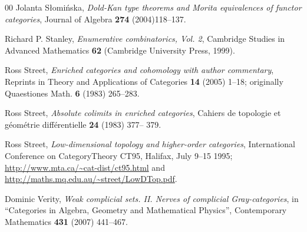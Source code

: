\documentclass[a4paper,12pt,reqno]{amsart}
\theoremstyle{definition}
\theoremstyle{fact}
\theoremstyle{genquest}
\theoremstyle{step}
\begin{document}
\begin{thebibliography}{00}
 Jolanta S\l omi\'nska, \textit{Dold-Kan type theorems and Morita equivalences of functor categories}, Journal of Algebra \textbf{274} (2004)118--137.\label{Slom}

 Richard P. Stanley, \textit{Enumerative combinatorics, Vol. 2}, Cambridge Studies in Advanced Mathematics \textbf{62} (Cambridge University Press, 1999).\label{Sta99} 

 Ross Street, \textit{Enriched categories and cohomology with author commentary}, Reprints in Theory and Applications of Categories \textbf{14} (2005) 1--18;
originally Quaestiones Math. \textbf{6} (1983) 265--283.\label{ECC}

 Ross Street, \textit{Absolute colimits in enriched categories}, Cahiers de topologie et g\'eom\'etrie diff\'erentielle \textbf{24} (1983) 377-- 379.\label{ACEC}

 Ross Street, \textit{Low-dimensional topology and higher-order categories}, International Conference on CategoryTheory CT95, Halifax, July 9--15 1995; \url{http://www.mta.ca/~cat-dist/ct95.html} and \url{http://maths.mq.edu.au/~street/LowDTop.pdf}.\label{LDTHOC}

 Dominic Verity, \textit{Weak complicial sets. II. Nerves of complicial Gray-categories}, 
in ``Categories in Algebra, Geometry and Mathematical Physics'', 
Contemporary Mathematics \textbf{431} (2007) 441--467.\label{Verity07}

\end{thebibliography}
\end{document}
